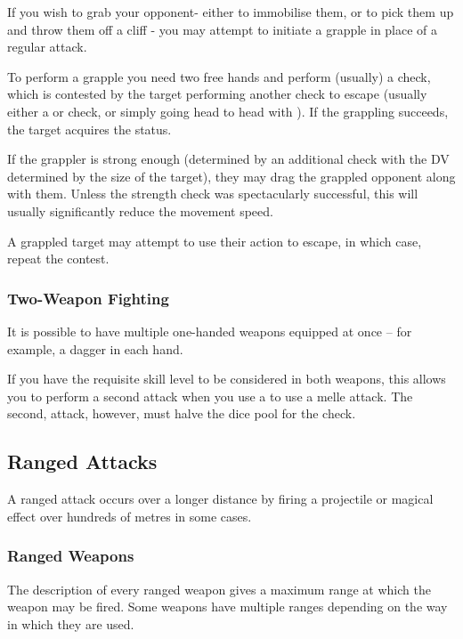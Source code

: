 If you wish to grab your opponent- either to immobilise them, or to pick them up and throw them off a cliff - you may attempt to initiate a grapple in place of a regular attack. 

To perform a grapple you need two free hands and perform (usually) a  check, which is contested by the target performing another check to escape (usually either a  or  check, or simply going head to head with ). If the grappling succeeds, the target acquires the  status. 

If the grappler is strong enough (determined by an additional  check with the DV determined by the size of the target), they may drag the grappled opponent along with them. Unless the strength check was spectacularly successful, this will usually significantly reduce the movement speed. 

A grappled target may attempt to use their action to escape, in which case, repeat the contest. 

\subsubsection{Two-Weapon Fighting}

It is possible to have multiple one-handed weapons equipped at once -- for example, a dagger in each hand. 

If you have the requisite skill level to be considered  in both weapons, this allows you to perform a second attack when you use a  to use a melle attack. The second, attack, however, must halve the dice pool for the check.


\subsection{Ranged Attacks}

A ranged attack occurs over a longer distance by firing a projectile or magical effect over hundreds of metres in some cases. 

\subsubsection{Ranged Weapons}

The description of every ranged weapon gives a maximum range at which the weapon may be fired. Some weapons have multiple ranges depending on the way in which they are used. 

